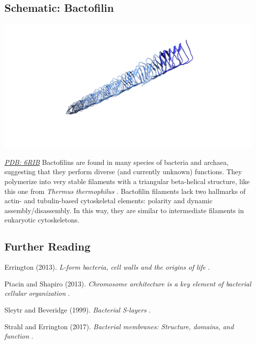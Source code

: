 \documentclass[]{tufte-book}
\begin{document}
\subsection*{Schematic: Bactofilin}\label{Bactofilin}

\includegraphics{img/3_6_1}

\href{http://rcsb.org/structure/6RIB}{\emph{PDB: 6RIB}} Bactofilins are
found in many species of bacteria and archaea, suggesting that they
perform diverse (and currently unknown) functions. They polymerize into
very stable filaments with a triangular beta-helical structure, like
this one from \emph{Thermus thermophilus} \citep{deng2019}. Bactofilin
filaments lack two hallmarks of actin- and tubulin-based cytoskeletal
elements: polarity and dynamic assembly/disassembly. In this way, they
are similar to intermediate filaments in eukaryotic cytoskeletons.

\subsection*{Further Reading}\label{further-reading}

Errington (2013). \emph{L-form bacteria, cell walls and the origins of
life} \citep{errington2013}.

Ptacin and Shapiro (2013). \emph{Chromosome architecture is a key
element of bacterial cellular organization} \citep{ptacin2013}.

Sleytr and Beveridge (1999). \emph{Bacterial S-layers}
\citep{sleytr1999}.

Strahl and Errington (2017). \emph{Bacterial membranes: Structure,
domains, and function} \citep{strahl2017}.


\end{document}
